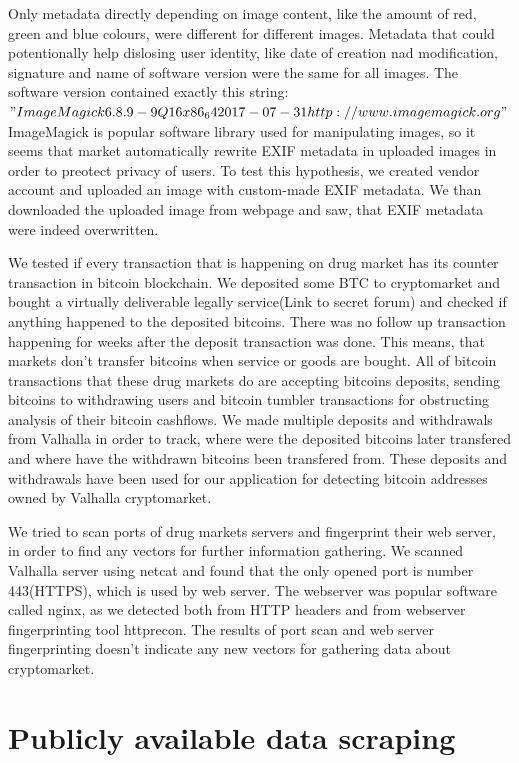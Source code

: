 \documentclass[
  digital, %
  table,   %
  lof,     %
  lot,     %
  oneside
]{fithesis3}
\begin{document}
Only metadata directly depending on image content, like the amount of red, green and blue colours,
were different for different images.
Metadata that could potentionally help dislosing user identity,
like date of creation nad modification, signature and name of software version were the same for all images.
The software version contained exactly this string:
$"ImageMagick 6.8.9-9 Q16 x86_64 2017-07-31 http://www.imagemagick.org"$
ImageMagick is popular software library used for manipulating images, so it seems
that market automatically rewrite EXIF metadata in uploaded images in order to preotect privacy of users.
To test this hypothesis, we created vendor account and uploaded an image with
custom-made EXIF metadata. We than downloaded the uploaded image from webpage and 
saw, that EXIF metadata were indeed overwritten.

We tested if every transaction that is happening on drug market has its counter transaction
in bitcoin blockchain.
We deposited some BTC to cryptomarket and bought a virtually deliverable
legally service(Link to secret forum) and checked if anything happened to the deposited bitcoins.
There was no follow up transaction happening for weeks after the deposit transaction was done.
This means, that markets don't transfer bitcoins when service or goods are bought.
All of bitcoin transactions that these drug markets do 
are accepting bitcoins deposits,
sending bitcoins to withdrawing users and bitcoin tumbler transactions for
obstructing analysis of their bitcoin cashflows.
We made multiple deposits and withdrawals from Valhalla in order to track,
where were the deposited bitcoins later transfered and where have the withdrawn
bitcoins been transfered from. These deposits and withdrawals have been
used for our application for detecting bitcoin addresses owned by Valhalla cryptomarket.

We tried to scan ports of drug markets servers and fingerprint their web server,
in order to find any vectors for further information gathering.
We scanned Valhalla server using netcat and found that the only opened port is number 443(HTTPS),
which is used by web server. The webserver was popular software called nginx, as we detected
both from HTTP headers and from webserver fingerprinting tool httprecon.
The results of port scan and web server fingerprinting doesn't indicate
any new vectors for gathering data about cryptomarket.

\section{Publicly available data scraping}
\end{document}
